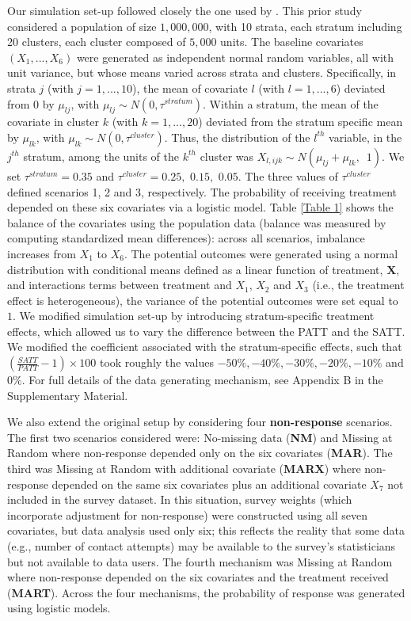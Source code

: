 \documentclass[oupdraft]{bio}
\begin{document}
Our simulation set-up followed closely the one used by \citet{austin2016propensity}. This prior study considered a population of size $1,000,000$, with 10 strata, each stratum including 20 clusters, each cluster composed of $5,000$ units. The baseline covariates $\left(X_{1},...,X_{6}\right)$ were generated as independent normal random variables, all with unit variance, but whose means varied across strata and clusters. Specifically, in strata $j$ (with $j=1,...,10$), the mean of covariate $l$ (with $l=1,...,6$) deviated from $0$ by $\mu_{lj}$, with $\mu_{lj}\sim N\left(0,\tau^{stratum}\right)$. Within a stratum, the mean of the covariate in cluster $k$ (with $k=1,...,20$) deviated from the stratum specific mean by $\mu_{lk}$, with $\mu_{lk}\sim N\left(0,\tau^{cluster}\right)$.
Thus, the distribution of the $l^{th}$ variable, in the $j^{th}$ stratum, among the units of the $k^{th}$ cluster was $X_{l,ijk}\sim N\left(\mu_{lj}+\mu_{lk},\,\,\,1\right)$.
We set $\tau^{stratum}=0.35$ and $\tau^{cluster}=0.25,\,\,0.15,\,\,0.05$. The three values of $\tau^{cluster}$ defined scenarios 1, 2 and 3, respectively. The probability of receiving treatment depended on these six covariates via a logistic model. Table \ref{Table 1} shows the balance of the covariates using the population data (balance was measured by computing standardized mean differences): across all scenarios, imbalance increases from $X_{1}$ to $X_{6}$. The potential outcomes were generated using a normal distribution with conditional means defined as a linear function of treatment, $\mathbf{X}$, and interactions terms between treatment and $X_{1}$, $X_{2}$ and $X_{3}$ (i.e., the treatment effect is heterogeneous), the variance of the potential outcomes were set equal to $1$. We modified \citet{austin2016propensity} simulation set-up by introducing stratum-specific treatment effects, which allowed us to vary the difference between the PATT and the SATT. We modified the coefficient associated with the stratum-specific effects, such that $\left(\frac{SATT}{PATT}-1\right)\times100$ took roughly the values $-50\%, -40\%, -30\%, -20\%, -10\%$ and $0\%$. For full details of the data generating mechanism, see Appendix B in the Supplementary Material.

We also extend the original setup by considering four \textbf{non-response} scenarios. The first two scenarios considered were: No-missing data (\textbf{NM}) and Missing at Random where non-response depended only on the six covariates (\textbf{MAR}). The third was Missing at Random with additional covariate (\textbf{MARX}) where non-response depended on the same six covariates plus an additional covariate $X_{7}$ not included in the survey dataset. In this situation, survey weights (which incorporate adjustment for non-response) were constructed using all seven covariates, but data analysis used only six; this reflects the reality that some data (e.g., number of contact attempts) may be available to the survey's statisticians but not available to data users. The fourth mechanism was Missing at Random where non-response depended on the six covariates and the treatment received (\textbf{MART}). Across the four mechanisms, the probability of response was generated using logistic models. 
\end{document}
